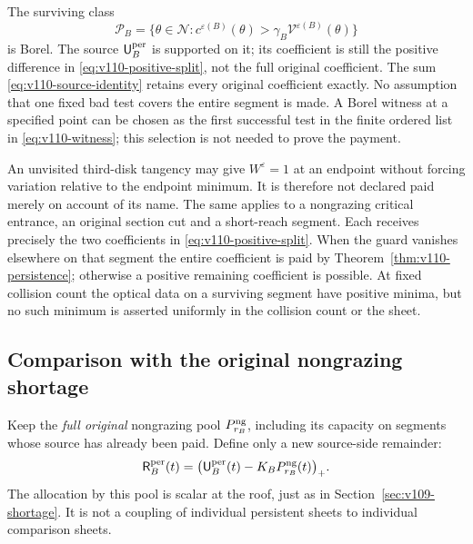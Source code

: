 The surviving class
\begin{equation}\label{eq:v110-persistent-class}
 \mathcal P_B=\{\theta\in\mathcal N:
       c^{\varepsilon(B)}(\theta)>
                      \gamma_B\mathcal V^{\varepsilon(B)}(\theta)\}
\end{equation}
is Borel. The source $\mathsf U_B^{\rm per}$ is supported on it;
its coefficient is still the positive difference in
\eqref{eq:v110-positive-split}, not the full original coefficient.
The sum \eqref{eq:v110-source-identity} retains every original
coefficient exactly. No assumption that one fixed bad test covers
the entire segment is made. A Borel witness at a specified point
can be chosen as the first successful test in the finite ordered
list in \eqref{eq:v110-witness}; this selection is not needed to
prove the payment.

\begin{remark}
An unvisited third-disk tangency may give $W^\varepsilon=1$ at an
endpoint without forcing variation relative to the endpoint minimum.
It is therefore not declared paid merely on account of its name.
The same applies to a nongrazing critical entrance, an original
section cut and a short-reach segment. Each receives precisely the
two coefficients in \eqref{eq:v110-positive-split}. When the guard
vanishes elsewhere on that segment the entire coefficient is paid
by Theorem~\ref{thm:v110-persistence}; otherwise a positive remaining
coefficient is possible. At fixed collision count the optical data
on a surviving segment have positive minima, but no such minimum
is asserted uniformly in the collision count or the sheet.
\end{remark}

\subsection{Comparison with the original nongrazing shortage}
Keep the \emph{full original} nongrazing pool $P_{r_B}^{\rm ng}$,
including its capacity on segments whose source has already been
paid. Define only a new source-side remainder:
\begin{equation}\label{eq:v110-persistent-residual}
 \mathsf R_B^{\rm per}(t)
   =\bigl(\mathsf U_B^{\rm per}(t)
                         -K_BP_{r_B}^{\rm ng}(t)\bigr)_+.
\end{equation}
The allocation by this pool is scalar at the roof, just as in
Section~\ref{sec:v109-shortage}. It is not a coupling of individual
persistent sheets to individual comparison sheets.

